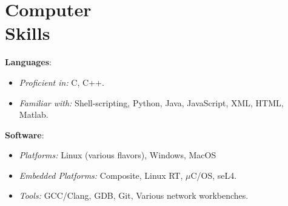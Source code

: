 \section{Computer\\Skills}

\textbf{Languages}:
\begin{itemize}[leftmargin=*]
  \setlength\itemsep{-0.0em}
\item {\sl Proficient in:} {C, C++.}
\item {\sl Familiar with:} {Shell-scripting, Python, Java, JavaScript, XML, HTML, Matlab.}
\end{itemize}
\vspace{-0.5em}
\textbf{Software}:
\begin{itemize}[leftmargin=*]
  \setlength\itemsep{-0.0em}
\item {\sl Platforms:} {Linux (various flavors), Windows, MacOS}
\item {\sl Embedded Platforms:} {Composite, Linux RT, $\mu$C/OS, seL4.}
\item {\sl Tools:} {GCC/Clang, GDB, Git, Various network workbenches.}
\end{itemize}
